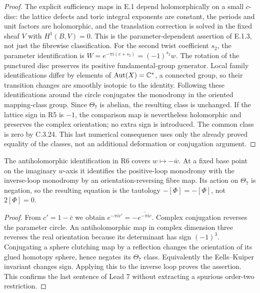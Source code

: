 \begin{proof}
The explicit sufficiency maps in E.1 depend holomorphically on a
small $c$-disc: the lattice defects and toric integral exponents are
constant, the periods and unit factors are holomorphic, and the
translation correction is solved in the fixed sheaf $V$ with
$H^1(B,V)=0$. This is the parameter-dependent assertion of E.1.3,
not just the fibrewise classification. For the second twist
coefficient $s_2$, the parameter identification is
$W=e^{-\pi i(c+s_2)}=(-1)^{s_2}w$.
The rotation of the punctured disc preserves its positive
fundamental-group generator. Local family identifications differ
by elements of $\operatorname{Aut}(X)=\mathbb C^*$, a connected group, so their
transition changes are smoothly isotopic to the identity. Following
these identifications around the circle conjugates the monodromy
in the oriented mapping-class group. Since $\Theta_7$ is abelian,
the resulting class is unchanged. If the lattice sign in R5 is
$-1$, the comparison map is nevertheless holomorphic and preserves
the complex orientation; no extra sign is introduced.
The common class is zero by C.3.24. This last numerical consequence
uses only the already proved equality of the classes, not an
additional deformation or conjugation argument.
\end{proof}

\begin{proposition}
The antiholomorphic identification in R6 covers
$w\mapsto-\bar w$. At a fixed base point on the imaginary
$w$-axis it identifies the positive-loop monodromy with the
inverse-loop monodromy by an orientation-reversing fibre map.
Its action on $\Theta_7$ is negation, so the resulting equation is
the tautology $-[\Phi]=-[\Phi]$, not $2[\Phi]=0$.
\end{proposition}

\begin{proof}
From $c'=1-\bar c$ we obtain
$e^{-\pi ic'}=-\overline{e^{-\pi ic}}$.
Complex conjugation reverses the parameter circle. An
antiholomorphic map in complex dimension three reverses the real
orientation because its determinant has sign $(-1)^3$.
Conjugating a sphere clutching map by a reflection changes the
orientation of its glued homotopy sphere, hence negates its
$\Theta_7$ class. Equivalently the Eells--Kuiper invariant changes
sign. Applying this to the inverse loop proves the assertion.
This confirms the last sentence of Lead 7 without extracting a
spurious order-two restriction.
\end{proof}

